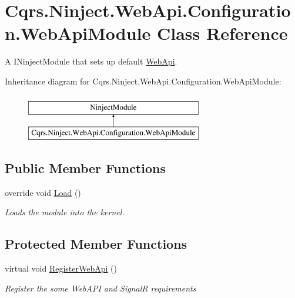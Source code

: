 \hypertarget{classCqrs_1_1Ninject_1_1WebApi_1_1Configuration_1_1WebApiModule}{}\section{Cqrs.\+Ninject.\+Web\+Api.\+Configuration.\+Web\+Api\+Module Class Reference}
\label{classCqrs_1_1Ninject_1_1WebApi_1_1Configuration_1_1WebApiModule}


A I\+Ninject\+Module that sets up default \hyperlink{namespaceCqrs_1_1Ninject_1_1WebApi}{Web\+Api}.  


Inheritance diagram for Cqrs.\+Ninject.\+Web\+Api.\+Configuration.\+Web\+Api\+Module\+:\begin{figure}[H]
\begin{center}
\leavevmode
\includegraphics[height=2.000000cm]{classCqrs_1_1Ninject_1_1WebApi_1_1Configuration_1_1WebApiModule}
\end{center}
\end{figure}
\subsection*{Public Member Functions}
\begin{DoxyCompactItemize}
\item 
override void \hyperlink{classCqrs_1_1Ninject_1_1WebApi_1_1Configuration_1_1WebApiModule_aea07833aa64eebb9996d681102d6aacd}{Load} ()
\begin{DoxyCompactList}\small\item\em Loads the module into the kernel. \end{DoxyCompactList}\end{DoxyCompactItemize}
\subsection*{Protected Member Functions}
\begin{DoxyCompactItemize}
\item 
virtual void \hyperlink{classCqrs_1_1Ninject_1_1WebApi_1_1Configuration_1_1WebApiModule_a6348f033ad2ec9300eb20bf0c763be1f}{Register\+Web\+Api} ()
\begin{DoxyCompactList}\small\item\em Register the some Web\+A\+PI and SignalR requirements \end{DoxyCompactList}\end{DoxyCompactItemize}


